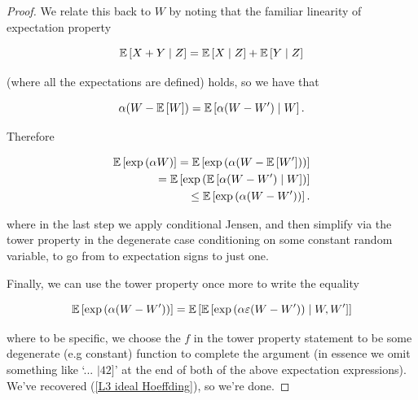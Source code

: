 \documentclass[11pt]{scrartcl}
\begin{document}
\begin{theorem}
\begin{proof}
We relate this back to $W$ by noting that the familiar linearity of expectation property

\begin{equation}
    \mathbb{E} \left[ X + Y \mid Z \right] = \mathbb{E} \left[ X \mid Z \right] + \mathbb{E} \left[ Y \mid Z \right]
\end{equation}

(where all the expectations are defined) holds, so we have that 

\begin{equation}
    \alpha (W - \mathbb{E} \left[ W \right]) = \mathbb{E} \left[ \alpha(W-W') \mid W \right].
\end{equation}

Therefore

\begin{align}
    \E{\exp{\alpha W}} = \E{\exp{\alpha (W-\E{W'})}} \\
    = \E{\exp{\E{\alpha(W-W') \mid W}}} \\
    \le \E{\exp{\alpha (W-W')}}. %
\end{align}

where in the last step we apply conditional Jensen, and then simplify via the tower property in the degenerate case conditioning on some constant random variable, to go from to expectation signs to just one.

Finally, we can use the tower property once more to write the equality

\begin{equation}
    \mathbb{E} \left[ \text{exp} \left( \alpha (W-W') \right) \right] = \mathbb{E} \left[ \mathbb{E} \left[  \text{exp} \left( \alpha \varepsilon (W-W') \right) \mid W, W'  \right] \right]
\end{equation}

where to be specific, we choose the $f$ in the tower property statement to be some degenerate (e.g constant) function to complete the argument (in essence we omit something like `... $\mid 42]$' at the end of both of the above expectation expressions). We've recovered (\ref{L3 ideal Hoeffding}), so we're done.





\end{proof}
\end{theorem}
\end{document}

